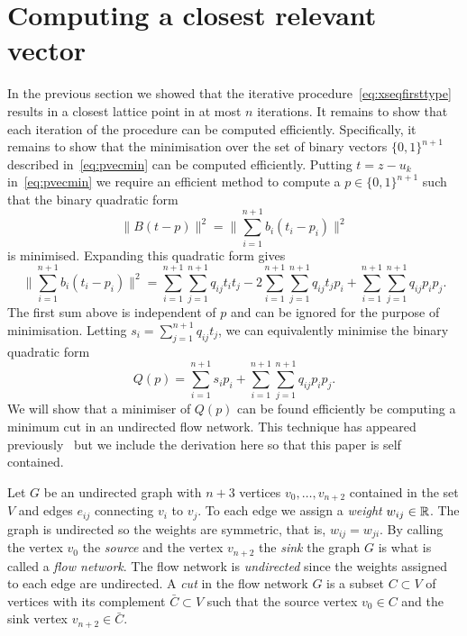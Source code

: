 \documentclass[final,leqno]{siamltex}
\begin{document}
\section{Computing a closest relevant vector}\label{sec:comp-clos-relev}

In the previous section we showed that the iterative procedure~\eqref{eq:xseqfirsttype} results in a closest lattice point in at most $n$ iterations.  It remains to show that each iteration of the procedure can be computed efficiently.  Specifically, it remains to show that the minimisation over the set of binary vectors $\{0,1\}^{n+1}$ described in~\eqref{eq:pvecmin} can be computed efficiently.  Putting $t = z - u_k$ in~\eqref{eq:pvecmin} we require an efficient method to compute a $p \in \{0,1\}^{n+1}$ such that the binary quadratic form
\[
\| B(t - p) \|^2 = \| \sum_{i=1}^{n+1} b_i (t_i - p_i) \|^2
\]
is minimised.  Expanding this quadratic form gives
\[
\| \sum_{i=1}^{n+1} b_i (t_i - p_i) \|^2 =  \sum_{i=1}^{n+1}\sum_{j=1}^{n+1} q_{ij}t_i t_j -  2\sum_{i=1}^{n+1}\sum_{j=1}^{n+1} q_{ij}t_j p_i + \sum_{i=1}^{n+1}\sum_{j=1}^{n+1} q_{ij} p_i p_j.
\]
The first sum above is independent of $p$ and can be ignored for the purpose of minimisation.  Letting $s_i = \sum_{j=1}^{n+1} q_{ij}t_j$, we can equivalently minimise the binary quadratic form
\begin{equation}\label{eq:quadformnp}
Q(p) = \sum_{i=1}^{n+1} s_i p_i + \sum_{i=1}^{n+1}\sum_{j=1}^{n+1} q_{ij} p_i p_j.
\end{equation}
We will show that a minimiser of $Q(p)$ can be found efficiently be computing a minimum cut in an undirected flow network.
This technique has appeared previously~\cite{Picard_min_cuts_1974,Sankaran_solving_CDMA_mincut_1998,Ulukus_cdma_mincut_1998,Cormen2001} but we include the derivation here so that this paper is self contained.

Let $G$ be an undirected graph with $n+3$ vertices $v_0, \dots, v_{n+2}$ contained in the set $V$ and edges $e_{ij}$ connecting $v_i$ to $v_j$.  To each edge we assign a \emph{weight} $w_{ij} \in {\mathbb R}$.  The graph is undirected so the weights are symmetric, that is, $w_{ij} = w_{ji}$.  By calling the vertex $v_0$ the \emph{source} and the vertex $v_{n+2}$ the \emph{sink} the graph $G$ is what is called a \emph{flow network}.  The flow network is \emph{undirected} since the weights assigned to each edge are undirected.  A \emph{cut} in the flow network $G$ is a subset $C \subset V$ of vertices with its complement $\bar{C} \subset V$ such that the source vertex $v_0 \in C$ and the sink vertex $v_{n+2} \in \bar{C}$.  %
\end{document}
